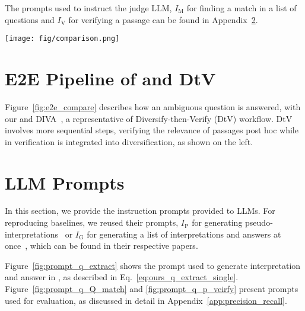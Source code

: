 The prompts used to instruct the judge LLM, $I_\textrm{M}$ for finding a match in a list of questions and $I_\textrm{V}$ for verifying a passage can be found in Appendix~\ref{app:prompts}.




 


\begin{figure*}[tbp]
\centering
\texttt{[image: fig/comparison.png]}
\caption{
Comparison of end-to-end workflow of \ours and DtV (DIVA; \citealp{in-etal-2024-diversify-arxiv}) for handling ambiguous question answering task. Vertical arrangement denotes sequential dependency, while calls that can run in parallel are placed at the same horizontal level.
}
\label{fig:e2e_compare}
\end{figure*}

\section{E2E Pipeline of \ours and DtV}
\label{app:detailed_workflow}
Figure~\ref{fig:e2e_compare} describes how an ambiguous question is answered, with our \ours and DIVA~\citep{in-etal-2024-diversify-arxiv}, a representative of Diversify-then-Verify (DtV) workflow.
DtV involves more sequential steps, verifying the relevance of passages post hoc while in \ours verification is integrated into diversification, as shown on the left.


\section{LLM Prompts}
\label{app:prompts}
In this section, we provide the instruction prompts provided to LLMs.
For reproducing baselines, we reused their prompts, $I_{\textrm{P}}$ for generating pseudo-interpretations~\citep{in-etal-2024-diversify-arxiv} or $I_{\textrm{G}}$ for generating a list of interpretations and answers at once~\citep{kim-etal-2023-tree}, which can be found in their respective papers.

Figure~\ref{fig:prompt_q_extract} shows the prompt used to generate interpretation and answer in \ours, as described in Eq.~\ref{eq:ours_q_extract_single}.
Figure~\ref{fig:prompt_q_Q_match} and \ref{fig:prompt_q_p_veirfy} present prompts used for evaluation, as discussed in detail in Appendix~\ref{app:precision_recall}.

